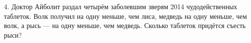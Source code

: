 4. Доктор Айболит раздал четырём заболевшим зверям 2014 чудодейственных таблеток. Волк получил на одну меньше, чем лиса, медведь на одну меньше, чем волк, а рысь --- на одну меньше, чем медведь. Сколько таблеток придётся съесть рыси?\\
